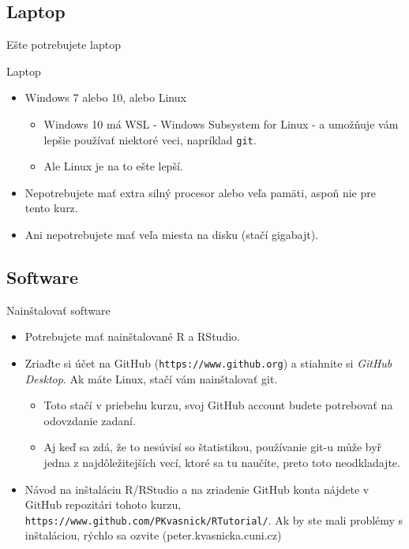 \subsection{Laptop}
\begin{frame}{Ešte potrebujete laptop}
	\begin{block}{Laptop}
		\begin{itemize}
			\item Windows 7 alebo 10, alebo Linux
			\begin{itemize}
				\item Windows 10 má WSL - Windows Subsystem for Linux - a umožňuje vám lepšie používať niektoré veci, napríklad \texttt{git}.
				\item Ale Linux je na to ešte lepší.
			\end{itemize}
			\item Nepotrebujete mať extra silný procesor alebo veľa pamäti, aspoň nie pre tento kurz.
			\item Ani nepotrebujete mať veľa miesta na disku (stačí gigabajt).
		\end{itemize}
	\end{block}
\end{frame}

\subsection{Software}

\begin{frame}
	\begin{block}{Nainštalovať software}
		\begin{itemize}
			\item Potrebujete mať nainštalované R a RStudio.
			\item Zriaďte si účet na GitHub (\texttt{https://www.github.org}) a stiahnite si \emph{GitHub Desktop}. Ak máte Linux, stačí vám nainštalovať git. 
			\begin{itemize}
				\item Toto stačí v priebehu kurzu, svoj GitHub account budete potrebovať na odovzdanie zadaní.
				\item Aj keď sa zdá, že to nesúvisí so štatistikou, používanie git-u může byř jedna z najdôležitejších vecí, ktoré sa tu naučíte, preto toto neodkladajte. 
			\end{itemize}
			\item Návod na inštaláciu R/RStudio a na zriadenie GitHub konta nájdete v GitHub repozitári tohoto kurzu, \texttt{https://www.github.com/PKvasnick/RTutorial/}. Ak by ste mali problémy s inštaláciou, rýchlo sa ozvite (peter.kvasnicka\@mff.cuni.cz)
		\end{itemize}
	\end{block}
\end{frame}


